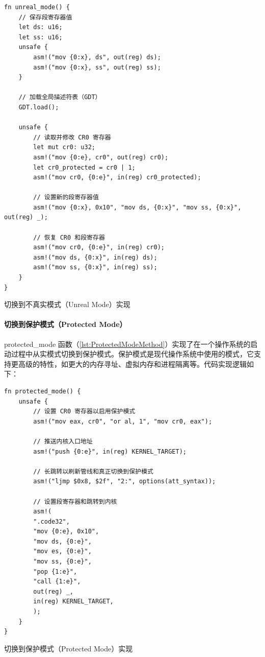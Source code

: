 \begin{listing}[htbp]
    \begin{verbatim}
fn unreal_mode() {
    // 保存段寄存器值
    let ds: u16;
    let ss: u16;
    unsafe {
        asm!("mov {0:x}, ds", out(reg) ds);
        asm!("mov {0:x}, ss", out(reg) ss);
    }

    // 加载全局描述符表（GDT）
    GDT.load();

    unsafe {
        // 读取并修改 CR0 寄存器
        let mut cr0: u32;
        asm!("mov {0:e}, cr0", out(reg) cr0);
        let cr0_protected = cr0 | 1;
        asm!("mov cr0, {0:e}", in(reg) cr0_protected);

        // 设置新的段寄存器值
        asm!("mov {0:x}, 0x10", "mov ds, {0:x}", "mov ss, {0:x}", out(reg) _);

        // 恢复 CR0 和段寄存器
        asm!("mov cr0, {0:e}", in(reg) cr0);
        asm!("mov ds, {0:x}", in(reg) ds);
        asm!("mov ss, {0:x}", in(reg) ss);
    }
}
    \end{verbatim}
    \caption{切换到不真实模式（Unreal Mode）实现}\label{lst:UnrealModeMethod}
\end{listing}

\paragraph{切换到保护模式（Protected Mode）}

protected\_mode 函数（\cref{lst:ProtectedModeMethod}）实现了在一个操作系统的启动过程中从实模式切换到保护模式。保护模式是现代操作系统中使用的模式，它支持更高级的特性，如更大的内存寻址、虚拟内存和进程隔离等。代码实现逻辑如下：

\begin{listing}[htbp]
    \begin{verbatim}
fn protected_mode() {
    unsafe {
        // 设置 CR0 寄存器以启用保护模式
        asm!("mov eax, cr0", "or al, 1", "mov cr0, eax");

        // 推送内核入口地址
        asm!("push {0:e}", in(reg) KERNEL_TARGET);

        // 长跳转以刷新管线和真正切换到保护模式
        asm!("ljmp $0x8, $2f", "2:", options(att_syntax));

        // 设置段寄存器和跳转到内核
        asm!(
        ".code32",
        "mov {0:e}, 0x10",
        "mov ds, {0:e}",
        "mov es, {0:e}",
        "mov ss, {0:e}",
        "pop {1:e}",
        "call {1:e}",
        out(reg) _,
        in(reg) KERNEL_TARGET,
        );
    }
}
    \end{verbatim}
    \caption{切换到保护模式（Protected Mode）实现}\label{lst:ProtectedModeMethod}
\end{listing}

